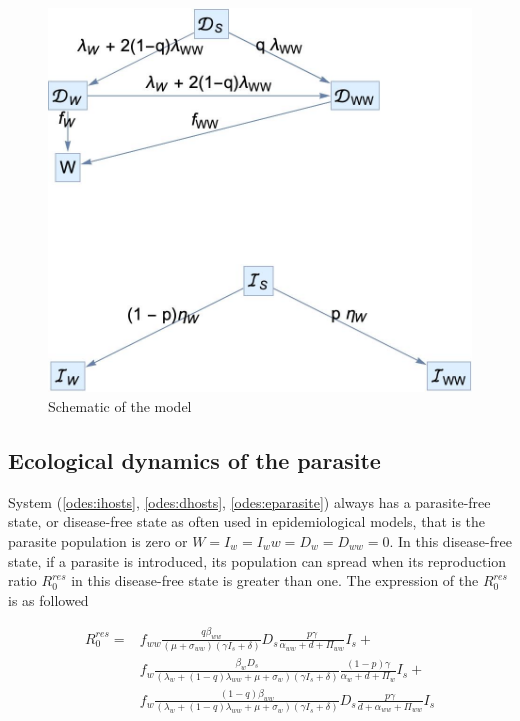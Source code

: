 \documentclass{article}
\begin{document}
\begin{figure}
\includegraphics[width=\textwidth]{Figures/schematic}
\caption{Schematic of the model}
\label{fig:schematic}
\end{figure}

\subsection{Ecological dynamics of the parasite}

System (\ref{odes:ihosts}, \ref{odes:dhosts}, \ref{odes:eparasite}) always has a parasite-free state, or disease-free state as often used in epidemiological models, that is the parasite population is zero or $W = I_w = I_ww = D_w = D_{ww} = 0$. In this disease-free state, if a parasite is introduced, its population can spread when its reproduction ratio $R^{res}_0$ in this disease-free state is greater than one. The expression of the $R^{res}_0$ is as followed

\begin{align}
R^{res}_0 =  &f_{ww} \frac{q \beta_{ww}  }{(\mu +\sigma_{ww})(\gamma  I_s + \delta)}  D_s \frac{p \gamma}{\alpha_{ww} + d + \Pi_{ww}} I_s   + \nonumber\\
           &  f_w \frac{\beta_w D_s }{(\lambda_w + (1-q)\lambda_{ww} +\mu + \sigma_w)(\gamma  I_s + \delta)} \frac{(1-p) \gamma}{\alpha_w + d + \Pi_w} I_s  +  \\
           & f_w \frac{(1-q) \beta_{ww}}{(\lambda_w + (1-q) \lambda_{ww} + \mu + \sigma_w)(\gamma  I_s + \delta)} D_s  \frac{p \gamma}{d + \alpha_{ww} + \Pi_{ww}} I_s  \nonumber
\end{align}
\end{document}

